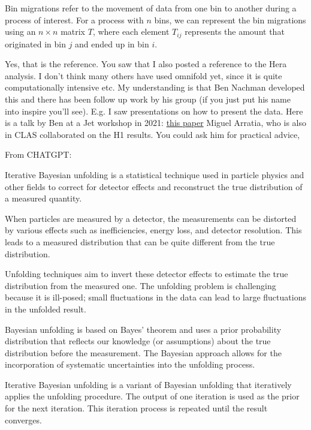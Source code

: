     
    Bin migrations refer to the movement of data from one bin to another during a process of interest. For a process with $n$ bins, we can represent the bin migrations using an $n \times n$ matrix $T$, where each element $T_{ij}$ represents the amount that originated in bin $j$ and ended up in bin $i$. 
    
        
   
    
    
    
    Yes, that is the reference. You saw that I also posted a reference to the Hera analysis. I don’t think many others have used omnifold yet, since it is quite computationally intensive etc.
    My understanding is that Ben Nachman developed this and there has been follow up work by his group (if you just put his name into inspire you’ll see). E.g. I saw presentations on how to present the data. Here is a talk by Ben at a Jet workshop in 2021: \href{https://indico.bnl.gov/event/10555/contributions/54721/attachments/37368/61570/H1Measurement_EICWorkshopSeptember2021.pdf}{this paper}
     Miguel Arratia, who is also in CLAS collaborated on the H1 results. You could ask him for practical advice,
    
    From CHATGPT:
    
    
    Iterative Bayesian unfolding is a statistical technique used in particle physics and other fields to correct for detector effects and reconstruct the true distribution of a measured quantity.
    
    When particles are measured by a detector, the measurements can be distorted by various effects such as inefficiencies, energy loss, and detector resolution. This leads to a measured distribution that can be quite different from the true distribution.
    
    Unfolding techniques aim to invert these detector effects to estimate the true distribution from the measured one. The unfolding problem is challenging because it is ill-posed; small fluctuations in the data can lead to large fluctuations in the unfolded result.
    
    Bayesian unfolding is based on Bayes' theorem and uses a prior probability distribution that reflects our knowledge (or assumptions) about the true distribution before the measurement. The Bayesian approach allows for the incorporation of systematic uncertainties into the unfolding process.
    
    Iterative Bayesian unfolding is a variant of Bayesian unfolding that iteratively applies the unfolding procedure. The output of one iteration is used as the prior for the next iteration. This iteration process is repeated until the result converges.
    
